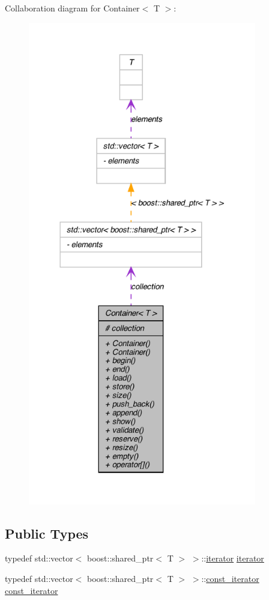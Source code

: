 Collaboration diagram for Container$<$ T $>$:
\nopagebreak
\begin{figure}[H]
\begin{center}
\leavevmode
\includegraphics[height=600pt]{class_container__coll__graph}
\end{center}
\end{figure}
\subsection*{Public Types}
\begin{DoxyCompactItemize}
\item 
typedef std::vector$<$ boost::shared\_\-ptr$<$ T $>$ $>$::\hyperlink{class_container_afe880028d8304353129f47cd1d28c20a}{iterator} \hyperlink{class_container_afe880028d8304353129f47cd1d28c20a}{iterator}
\item 
typedef std::vector$<$ boost::shared\_\-ptr$<$ T $>$ $>$::\hyperlink{class_container_a5eabadaffdd508cb623c955eb0af1518}{const\_\-iterator} \hyperlink{class_container_a5eabadaffdd508cb623c955eb0af1518}{const\_\-iterator}
\end{DoxyCompactItemize}
